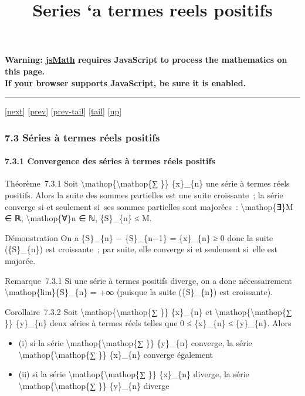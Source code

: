 \documentclass[]{article}
\title{Series `a termes reels positifs}
\author{}
\date{}
\begin{document}
\maketitle

\textbf{Warning: \href{http://www.math.union.edu/locate/jsMath}{jsMath}
requires JavaScript to process the mathematics on this page.\\ If your
browser supports JavaScript, be sure it is enabled.}

\begin{center}\rule{3in}{0.4pt}\end{center}

{[}\href{coursse38.html}{next}{]} {[}\href{coursse36.html}{prev}{]}
{[}\href{coursse36.html\#tailcoursse36.html}{prev-tail}{]}
{[}\hyperref[tailcoursse37.html]{tail}{]}
{[}\href{coursch8.html\#coursse37.html}{up}{]}

\subsubsection{7.3 Séries à termes réels positifs}

\paragraph{7.3.1 Convergence des séries à termes réels positifs}

Théorème~7.3.1 Soit \textbackslash{}mathop\{\textbackslash{}mathop\{∑
\}\} \{x\}\_\{n\} une série à termes réels positifs. Alors la suite des
sommes partielles est une suite croissante~; la série converge si et
seulement si~ses sommes partielles sont majorées~:
\textbackslash{}mathop\{∃\}M ∈ ℝ, \textbackslash{}mathop\{∀\}n ∈ ℕ,
\{S\}\_\{n\} ≤ M.

Démonstration On a \{S\}\_\{n\} − \{S\}\_\{n−1\} = \{x\}\_\{n\} ≥ 0 donc
la suite (\{S\}\_\{n\}) est croissante~; par suite, elle converge si et
seulement si~elle est majorée.

Remarque~7.3.1 Si une série à termes positifs diverge, on a donc
nécessairement \textbackslash{}mathop\{lim\}\{S\}\_\{n\} = +∞ (puisque
la suite (\{S\}\_\{n\}) est croissante).

Corollaire~7.3.2 Soit \textbackslash{}mathop\{\textbackslash{}mathop\{∑
\}\} \{x\}\_\{n\} et \textbackslash{}mathop\{\textbackslash{}mathop\{∑
\}\} \{y\}\_\{n\} deux séries à termes réels telles que 0 ≤ \{x\}\_\{n\}
≤ \{y\}\_\{n\}. Alors

\begin{itemize}
\itemsep1pt\parskip0pt
\item
  (i) si la série \textbackslash{}mathop\{\textbackslash{}mathop\{∑ \}\}
  \{y\}\_\{n\} converge, la série
  \textbackslash{}mathop\{\textbackslash{}mathop\{∑ \}\} \{x\}\_\{n\}
  converge également
\item
  (ii) si la série \textbackslash{}mathop\{\textbackslash{}mathop\{∑
  \}\} \{x\}\_\{n\} diverge, la série
  \textbackslash{}mathop\{\textbackslash{}mathop\{∑ \}\} \{y\}\_\{n\}
  diverge
\end{itemize}
\end{document}
